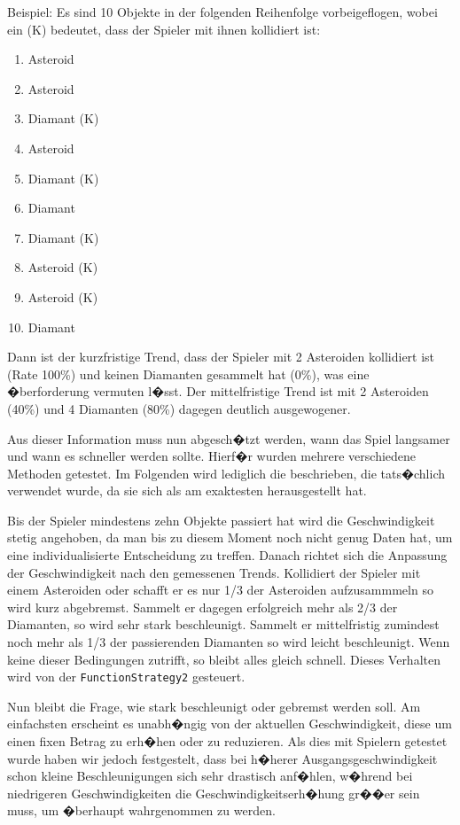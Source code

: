 \documentclass[a4paper,12pt]{scrartcl}
\newcommand*{\code}[1]{\texttt{#1}}%
\begin{document}
Beispiel: Es sind 10 Objekte in der folgenden Reihenfolge vorbeigeflogen, wobei ein (K)
bedeutet, dass der Spieler mit ihnen kollidiert ist:
\begin{enumerate}
\item Asteroid
\item Asteroid
\item Diamant (K)
\item Asteroid
\item Diamant (K)
\item Diamant
\item Diamant (K)
\item Asteroid (K)
\item Asteroid (K)
\item Diamant
\end{enumerate}
Dann ist der kurzfristige Trend, dass der Spieler mit 2 Asteroiden kollidiert
ist (Rate 100\%) und keinen Diamanten gesammelt hat (0\%), was eine �berforderung vermuten l�sst.
Der mittelfristige Trend ist mit 2 Asteroiden (40\%) und 4 Diamanten (80\%)
dagegen deutlich ausgewogener.

Aus dieser Information muss nun abgesch�tzt werden, wann das Spiel langsamer und wann
es schneller werden sollte. Hierf�r wurden mehrere verschiedene Methoden getestet. Im
Folgenden wird lediglich die beschrieben, die tats�chlich verwendet wurde, da sie sich als
am exaktesten herausgestellt hat.

Bis der Spieler mindestens zehn Objekte passiert hat wird die Geschwindigkeit stetig
angehoben, da man bis zu diesem Moment noch nicht genug Daten hat, um
eine individualisierte Entscheidung zu treffen. Danach richtet sich die Anpassung der
Geschwindigkeit nach den gemessenen Trends. Kollidiert der Spieler mit einem Asteroiden
oder schafft er es nur 1/3 der Asteroiden aufzusammmeln so wird kurz abgebremst.
Sammelt er dagegen erfolgreich mehr als 2/3 der Diamanten, so wird sehr stark
beschleunigt. Sammelt er mittelfristig zumindest noch mehr als 1/3 der
passierenden Diamanten so wird leicht beschleunigt. Wenn keine dieser Bedingungen zutrifft,
so bleibt alles gleich schnell. Dieses Verhalten wird von der \code{FunctionStrategy2} gesteuert.

Nun bleibt die Frage, wie stark beschleunigt oder gebremst werden soll. Am einfachsten
erscheint es unabh�ngig von der aktuellen Geschwindigkeit, diese um einen fixen Betrag
zu erh�hen oder zu reduzieren. Als dies mit Spielern getestet wurde haben wir jedoch
festgestelt, dass bei h�herer Ausgangsgeschwindigkeit schon kleine Beschleunigungen
sich sehr drastisch anf�hlen, w�hrend bei niedrigeren Geschwindigkeiten die
Geschwindigkeitserh�hung gr��er sein muss, um �berhaupt wahrgenommen zu werden.
\end{document}

